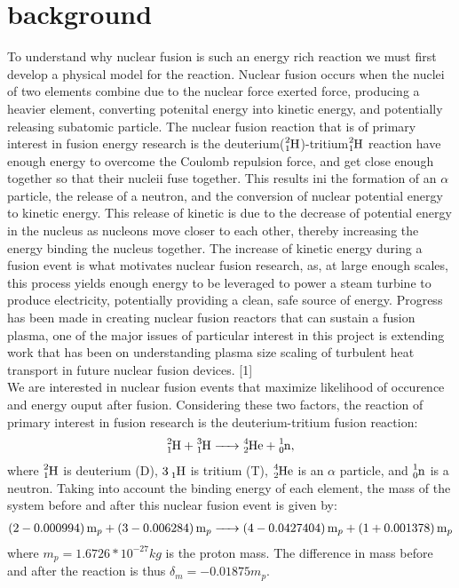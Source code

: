 \documentclass{article}
\begin{document}
\section{background}
To understand why nuclear fusion is such an energy rich reaction we must first develop a physical model for the reaction. Nuclear fusion occurs when the nuclei of two elements combine due to the nuclear force exerted force, producing a heavier element, converting potenital energy into kinetic energy, and potentially releasing subatomic particle. The nuclear fusion reaction that is of primary interest in fusion energy research is the deuterium($\ce{^2_1H}$)-tritium$\ce{^2_1H}$ reaction have enough energy to overcome the Coulomb repulsion force, and get close enough together so that their nucleii fuse together. This results ini the formation of an $\alpha$ particle, the release of a neutron, and the conversion of nuclear potential energy to kinetic energy. This release of kinetic is due to the decrease of potential energy in the nucleus as nucleons move closer to each other, thereby increasing the energy binding the nucleus together. The increase of kinetic energy during a fusion event is what motivates nuclear fusion research, as, at large enough scales, this process yields enough energy to be leveraged to power a steam turbine to produce electricity, potentially providing a clean, safe source of energy. Progress has been made in creating nuclear fusion reactors that can sustain a fusion plasma, one of the major issues of particular interest in this project is extending work that has been on understanding plasma size scaling of turbulent heat transport in future nuclear fusion devices. [1]\\
\newpage
We are interested in nuclear fusion events that maximize likelihood of occurence and energy ouput after fusion. Considering these two factors, the reaction of primary interest in fusion research is the deuterium-tritium fusion reaction:  
\begin{align*}
\ce{^2_1H + ^3_1H ->	^4_2He + ^1_0n}, 
\end{align*}	
where $\ce{^2_1H}$ is deuterium (D), $\ce{3_1H}$ is tritium (T),  $\ce{^4_2He}$ is an $\alpha$ particle, and $\ce{^1_0n}$ is a neutron.
Taking into account the binding energy of each element, the mass of the system before and after this nuclear fusion event is given by:
\begin{align*}
\ce{(2 - 0.000994)m_p +(3 - 0.006284) m_p -> (4 - 0.0427404)m_p + (1 + 0.001378)m_p}
\end{align*}
where $m_p=1.6726*10^{-27}kg$ is the proton mass. The difference in mass before and after the reaction is thus $\delta_m = -0.01875m_p$.\\
\end{document}
